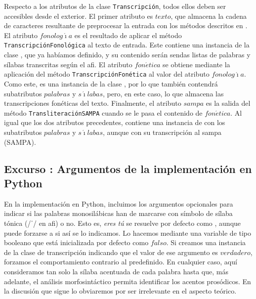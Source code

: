 Respecto a los atributos de la clase \texttt{Transcripción}, todos ellos deben ser accesibles desde el exterior. El primer atributo es $texto$, que almacena la cadena de caracteres resultante de preprocesar la entrada con los métodos descritos en . El atributo $fonolog\acute{\imath}a$ es el resultado de aplicar el método \texttt{TranscripciónFonológica} al texto de entrada. Este contiene una instancia de la clase \Valoresp, que ya habíamos definido, y su contenido serán sendas listas de palabras y sílabas transcritas según el \ac{afi}. El atributo $fon\acute{e}tica$ se obtiene mediante la aplicación del método \texttt{TranscripciónFonética} al valor del atributo $fonolog\acute{\imath}a$. Como este, es una instancia de la clase \Valoresp, por lo que también contendrá subatributos $palabras$ y $s\acute{\imath}labas$, pero, en este caso, lo que almacena las transcripciones fonéticas del texto. Finalmente, el atributo $sampa$ es la salida del método \texttt{TransliteraciónSAMPA} cuando se le pasa el contenido de $fon\acute{e}tica$. Al igual que los dos atributos precedentes, contiene una instancia de \Valoresp con los subatributos $palabras$ y $s\acute{\imath}labas$, aunque con su transcripción al \acl{sampa} (SAMPA). 

\subsection{Excurso : Argumentos de la implementación en Python}
En la implementación en Python, incluimos los argumentos opcionales para indicar si las palabras monosilábicas han de marcarse con símbolo de sílaba tónica (/ˈ/ en \ac{afi}) o no. Esto es, \textit{eres tú} se resuelve por defecto como , aunque puede forzarse a  si así se lo indicamos. Lo hacemos mediante una variable de tipo booleano que está inicializada por defecto como $falso$. Si creamos una instancia de la clase de transcripción indicando que el valor de  ese argumento es $verdadero$, forzamos el comportamiento contrario al predefinido. En cualquier caso, aquí consideramos tan solo la sílaba acentuada de cada palabra hasta que, más adelante, el análisis morfosintáctico permita identificar los acentos prosódicos. En la discusión que sigue lo obviaremos por ser irrelevante en el aspecto teórico.

